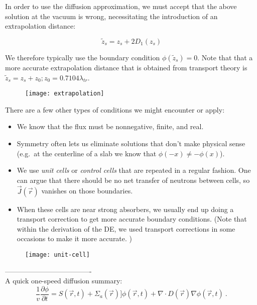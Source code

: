 \documentclass[12pt]{article}
\newcommand{\rvec}{\ensuremath{\vec{r}}}
\begin{document}
In order to use the diffusion approximation, we must accept that the above solution at the vacuum is wrong, necessitating the introduction of an extrapolation distance:

\begin{equation*}
\tilde{z}_s = z_s + 2D_1(z_s)
\end{equation*}

We therefore typically use the boundary condition $\phi(\tilde{z}_s) = 0$. 
Note that that a more accurate extrapolation distance that is obtained from transport theory is $\tilde{z}_s = z_s + z_0; z_0 = 0.7104 \lambda_{tr}$.

\begin{figure}
    \begin{center}
    \texttt{[image: extrapolation]}
    \end{center}
    \label{fig:phase_space}
\end{figure}

There are a few other types of conditions we might encounter or apply:
\begin{itemize}
\item We know that the flux must be nonnegative, finite, and real. 
\item Symmetry often lets us eliminate solutions that don't make physical sense (e.g.\ at the centerline of a slab we know that $\phi(-x) \neq - \phi(x)$). 
\item We use \textit{unit cells} or \textit{control cells} that are repeated in a regular fashion. 
One can argue that there should be no net transfer of neutrons between cells, so $\vec{J}(\rvec)$ vanishes on those boundaries.
\item When these cells are near strong absorbers, we usually end up doing a transport correction to get more accurate boundary conditions. 
(Note that within the derivation of the DE, we used transport corrections in some occasions to make it more accurate. )
\end{itemize}

\begin{figure}
    \begin{center}
    \texttt{[image: unit-cell]}
    \end{center}
    \label{fig:phase_space}
\end{figure}

-------------------------------------\\
A quick one-speed diffusion summary:
\[\frac{1}{v} \frac{\partial \phi}{\partial t} = S(\rvec, t) + \Sigma_a(\rvec) ]\phi(\rvec, t) + \nabla \cdot D(\rvec) \nabla \phi(\rvec, t)\:.\]
\end{document}
